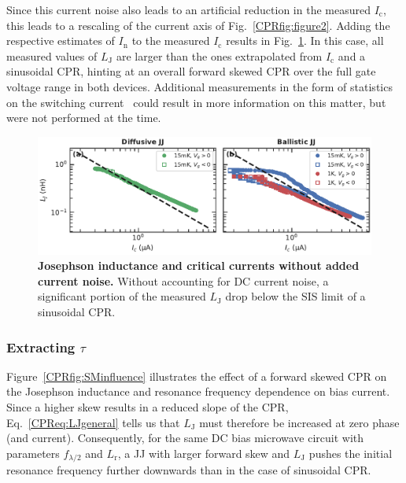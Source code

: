Since this current noise also leads to an artificial reduction in the measured $I_\text{c}$, this leads to a rescaling of the current axis of Fig.~\ref{CPRfig:figure2}.
%
Adding the respective estimates of $I_\text{n}$ to the measured $I_\text{c}$ results in Fig.~\ref{CPRfig:SMfigure2}.
%
In this case, all measured values of $L_\text{J}$ are larger than the ones extrapolated from $I_\text{c}$ and a sinusoidal CPR, hinting at an overall forward skewed CPR over the full gate voltage range in both devices.
%
Additional measurements in the form of statistics on the switching current~\cite{kiviojaWeakCouplingJosephson2005a,coskunDistributionSupercurrentSwitching2012,leeProximityCouplingSuperconductorgraphene2018a} could result in more information on this matter, but were not performed at the time.

\begin{figure}
	\centering
	\includegraphics[width=\linewidth]{chapter-gJJ-CPR/figs/Figure2}
	\caption{
		\textbf{Josephson inductance and critical currents without added current noise.}
		Without accounting for DC current noise, a significant portion of the measured $L_\text{J}$ drop below the SIS limit of a sinusoidal CPR.
	}
	\label{CPRfig:SMfigure2}
\end{figure}





\subsubsection{Extracting $\tau$}

Figure~\ref{CPRfig:SMinfluence} illustrates the effect of a forward skewed CPR on the Josephson inductance and resonance frequency dependence on bias current.
%
Since a higher skew results in a reduced slope of the CPR, Eq.~\ref{CPReq:LJgeneral} tells us that $L_\text{J}$ must therefore be increased at zero phase (and current).
%
Consequently, for the same DC bias microwave circuit with parameters $f_{\lambda/2}$ and $L_\text{r}$, a JJ with larger forward skew and $L_\text{J}$ pushes the initial resonance frequency further downwards than in the case of sinusoidal CPR.

